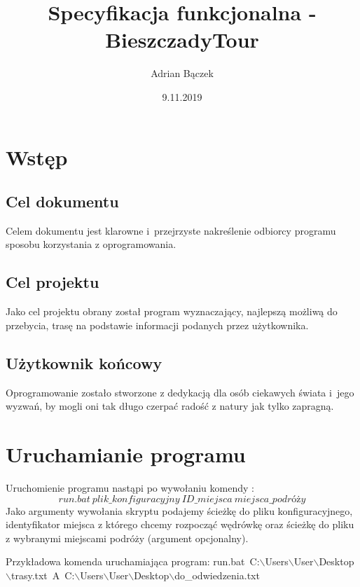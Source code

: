 \documentclass[10pt,oneside]{article}
\title{Specyfikacja funkcjonalna - BieszczadyTour}
\author{Adrian Bączek}
\date{9.11.2019}
\begin{document}
\maketitle


\thispagestyle{fancy}

\newpage


\section{Wstęp}
\subsection{Cel dokumentu}
Celem dokumentu jest klarowne i~przejrzyste nakreślenie 
odbiorcy programu sposobu korzystania z oprogramowania.
\subsection{Cel projektu}
Jako cel projektu obrany został program wyznaczający, najlepszą możliwą do przebycia, 
trasę na podstawie informacji podanych przez użytkownika.
\subsection{Użytkownik końcowy}
Oprogramowanie zostało stworzone z dedykacją dla osób ciekawych świata 
i~jego wyzwań, by mogli oni tak długo czerpać radość z natury jak tylko zapragną.

\section{Uruchamianie programu}
Uruchomienie programu nastąpi po wywołaniu komendy : $$run.bat~plik\_konfiguracyjny~ID\_miejsca~miejsca\_podróży$$
Jako argumenty wywołania skryptu podajemy ścieżkę do pliku konfiguracyjnego, identyfikator miejsca 
z którego chcemy rozpocząć wędrówkę oraz ścieżkę do pliku z wybranymi miejscami podróży (argument opcjonalny).

Przykładowa komenda uruchamiająca program:
\newline
run.bat~C:$\backslash$Users$\backslash$User$\backslash$Desktop$\backslash$trasy.txt~A~C:$\backslash$Users$\backslash$User$\backslash$Desktop$\backslash$do\_odwiedzenia.txt
\end{document}
